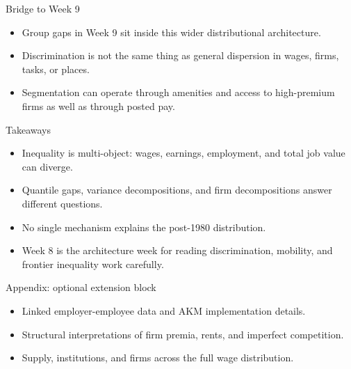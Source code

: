 \documentclass[aspectratio=169,11pt]{beamer}
\begin{document}
\begin{frame}{Bridge to Week 9}
\begin{itemize}
    \item Group gaps in Week 9 sit inside this wider distributional architecture.
    \item Discrimination is not the same thing as general dispersion in wages, firms, tasks, or places.
    \item Segmentation can operate through amenities and access to high-premium firms as well as through posted pay.
\end{itemize}
\end{frame}

\begin{frame}{Takeaways}
\begin{itemize}
    \item Inequality is multi-object: wages, earnings, employment, and total job value can diverge.
    \item Quantile gaps, variance decompositions, and firm decompositions answer different questions.
    \item No single mechanism explains the post-1980 distribution.
    \item Week 8 is the architecture week for reading discrimination, mobility, and frontier inequality work carefully.
\end{itemize}
\end{frame}

\appendix

\begin{frame}{Appendix: optional extension block}
\begin{itemize}
    \item Linked employer-employee data and AKM implementation details.
    \item Structural interpretations of firm premia, rents, and imperfect competition.
    \item Supply, institutions, and firms across the full wage distribution.
\end{itemize}
\end{frame}
\end{document}

